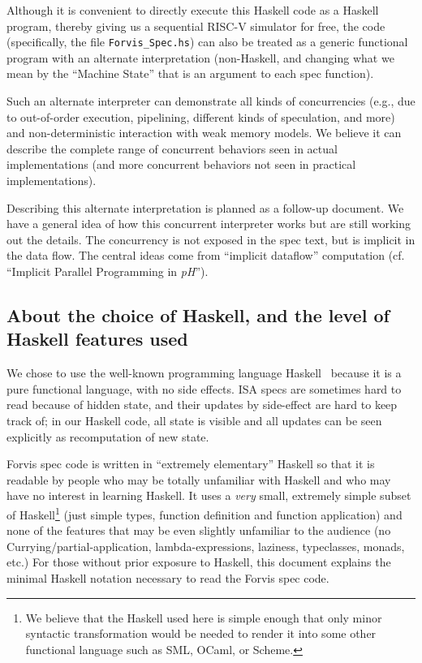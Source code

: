\documentclass[11pt]{article}
\begin{document}
Although it is convenient to directly execute this Haskell code as a
Haskell program, thereby giving us a sequential RISC-V simulator for
free, the code (specifically, the file \verb|Forvis_Spec.hs|) can also
be treated as a generic functional program with an alternate
interpretation (non-Haskell, and changing what we mean by the
``Machine State'' that is an argument to each spec function).

Such an alternate interpreter can demonstrate all kinds of
concurrencies (e.g., due to out-of-order execution, pipelining,
different kinds of speculation, and more) and non-deterministic
interaction with weak memory models.  We believe it can describe the
complete range of concurrent behaviors seen in actual implementations
(and more concurrent behaviors not seen in practical implementations).

Describing this alternate interpretation is planned as a follow-up
document.  We have a general idea of how this concurrent interpreter
works but are still working out the details.  The concurrency is not
exposed in the spec text, but is implicit in the data flow.  The
central ideas come from ``implicit dataflow'' computation (cf.
``Implicit Parallel Programming in \emph{pH}''\cite{Nikhil2000a}).


\subsection{About the choice of Haskell, and the level of Haskell features used}

We chose to use the well-known programming language
Haskell~\cite{PeytonJones2003} because it is a pure functional
language, with no side effects.  ISA specs are sometimes hard to read
because of hidden state, and their updates by side-effect are hard to
keep track of; in our Haskell code, all state is visible and all
updates can be seen explicitly as recomputation of new state.

Forvis spec code is written in ``extremely elementary'' Haskell so
that it is readable by people who may be totally unfamiliar with
Haskell and who may have no interest in learning Haskell.  It uses a
\emph{very} small, extremely simple subset of Haskell\footnote{ We
believe that the Haskell used here is simple enough that only minor
syntactic transformation would be needed to render it into some other
functional language such as SML, OCaml, or Scheme.}  (just simple
types, function definition and function application) and none of the
features that may be even slightly unfamiliar to the audience (no
Currying/partial-application, lambda-expressions, laziness,
typeclasses, monads, etc.)  For those without prior exposure to
Haskell, this document explains the minimal Haskell notation necessary
to read the Forvis spec code.
\end{document}
